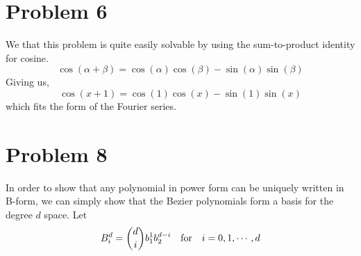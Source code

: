 \documentclass[11pt]{article}
\begin{document}
\section*{Problem 6}
We that this problem is quite easily solvable by using the sum-to-product identity for cosine. 
\[\cos{(\alpha + \beta)} = \cos{(\alpha)}\cos{(\beta)} - \sin{(\alpha)}\sin{(\beta)}\]
Giving us, 
\[\cos{(x+1)} = \cos{(1)}\cos{(x)} - \sin{(1)}\sin{(x)}\]
which fits the form of the Fourier series. 
\newpage
\section*{Problem 8}

In order to show that any polynomial in power form can be uniquely written in B-form, we can simply show that the Bezier polynomials form a basis for the degree $d$ space. 
Let
\[B^d_i = {{d}\choose{i}}b_1^1b_2^{d-i} \quad \hbox{for} \quad i=0,1, \cdots, d\]
\end{document}
